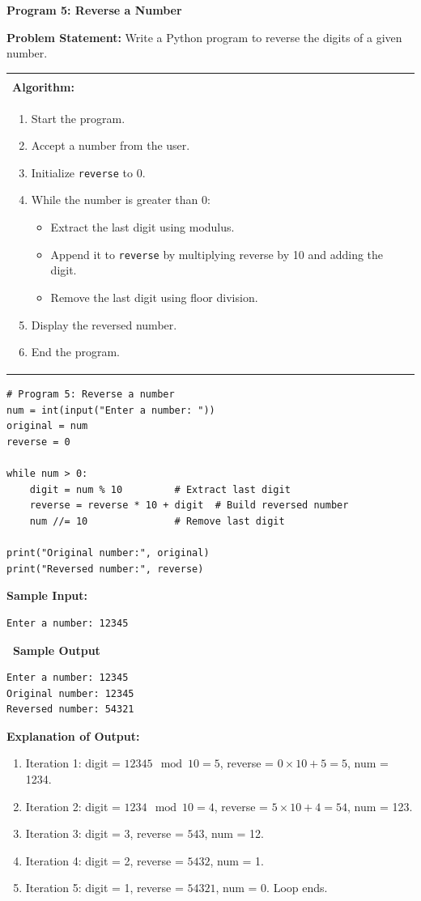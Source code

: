 \documentclass[12pt,a4paper]{article}
\makeatletter
\newcommand{\outhead}{\noindent\colorbox{cmrgreen!25}%
  {\textbf{\small\color{cmrdark}~Sample Output~}}\par\vspace{-1pt}}
\newenvironment{algobox}{%
  \par\vspace{4pt}%
  \noindent\begin{tabular}{@{}p{\linewidth}@{}}%
  \hline\\[-8pt]%
  \textbf{\color{blue!60!black}\small Algorithm:}\\[2pt]%
}{%
  \\[-4pt]\hline%
  \end{tabular}\par\vspace{4pt}%
}
\makeatother
\begin{document}
\vspace{0.5cm}

\textbf{Program 5: Reverse a Number}

\textbf{Problem Statement:}
Write a Python program to reverse the digits of a given number.

\begin{algobox}
\begin{enumerate}[label=Step \arabic*:]
  \item Start the program.
  \item Accept a number from the user.
  \item Initialize \texttt{reverse} to 0.
  \item While the number is greater than 0:
    \begin{itemize}
      \item Extract the last digit using modulus.
      \item Append it to \texttt{reverse} by multiplying reverse by 10 and adding the digit.
      \item Remove the last digit using floor division.
    \end{itemize}
  \item Display the reversed number.
  \item End the program.
\end{enumerate}
\end{algobox}

\begin{lstlisting}
# Program 5: Reverse a number
num = int(input("Enter a number: "))
original = num
reverse = 0

while num > 0:
    digit = num % 10         # Extract last digit
    reverse = reverse * 10 + digit  # Build reversed number
    num //= 10               # Remove last digit

print("Original number:", original)
print("Reversed number:", reverse)
\end{lstlisting}

\textbf{Sample Input:}
\begin{verbatim}
Enter a number: 12345
\end{verbatim}

\outhead
\begin{lstlisting}[style=outputstyle]
Enter a number: 12345
Original number: 12345
Reversed number: 54321
\end{lstlisting}

\textbf{Explanation of Output:}
\begin{enumerate}
  \item Iteration 1: digit = $12345 \mod 10 = 5$, reverse = $0 \times 10 + 5 = 5$, num = 1234.
  \item Iteration 2: digit = $1234 \mod 10 = 4$, reverse = $5 \times 10 + 4 = 54$, num = 123.
  \item Iteration 3: digit = 3, reverse = $543$, num = 12.
  \item Iteration 4: digit = 2, reverse = $5432$, num = 1.
  \item Iteration 5: digit = 1, reverse = $54321$, num = 0. Loop ends.
\end{enumerate}
\end{document}
